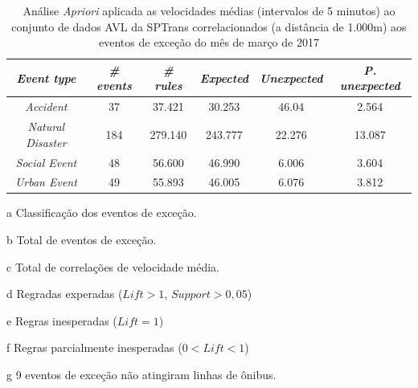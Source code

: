 \documentclass[
	12pt,				%
	oneside,			%
	a4paper,			%
	english,			%
	brazil				%
	]{abntex2ppgsi}
\begin{document}
\begin{apendicesenv}
\begin{table}[!htb]
\centering
\begin{threeparttable}
\caption {Análise \textit{Apriori} aplicada as velocidades médias (intervalos de 5 minutos) ao conjunto de dados AVL da SPTrans correlacionados (a distância de 1.000m) aos eventos de exceção do mês de março de 2017}
\label {tab:aprioriFull}
\begin{tabular}{c|c|c|c|c|c}
\hline
\textbf{\textit{Event type}}\tnote{a} & \textbf{\textit{\# events}}\tnote{b} & \textit{\textbf{\# rules}}\tnote{c} & \textbf{\textit{Expected}}\tnote{d} & \textbf{\textit{Unexpected}}\tnote{e} & \textbf{\textit{P. unexpected}}\tnote{f}   \\
\hline
\textit{Accident} & 37 & 37.421 & 30.253 & 46.04 & 2.564 \\
\textit{Natural Disaster} & 184 & 279.140 & 243.777 & 22.276 & 13.087 \\
\textit{Social Event} & 48 & 56.600 & 46.990 & 6.006 & 3.604 \\
\textit{Urban Event} & 49 & 55.893 & 46.005 & 6.076 & 3.812 \\
\hline
\end{tabular}
\begin{tablenotes}
            \item[a] Classificação dos eventos de exceção.
            \item[b] Total de eventos de exceção.
            \item[c] Total de correlações de velocidade média.
            \item[d] Regradas experadas ($Lift > 1$, $Support > 0,05$)
            \item[e] Regras inesperadas ($Lift = 1$)
            \item[f] Regras parcialmente inesperadas ($0 < Lift < 1$)
            \item[g] 9 eventos de exceção não atingiram linhas de ônibus.
        \end{tablenotes}
\end{threeparttable}
\end{table}


\end{apendicesenv}
\end{document}
